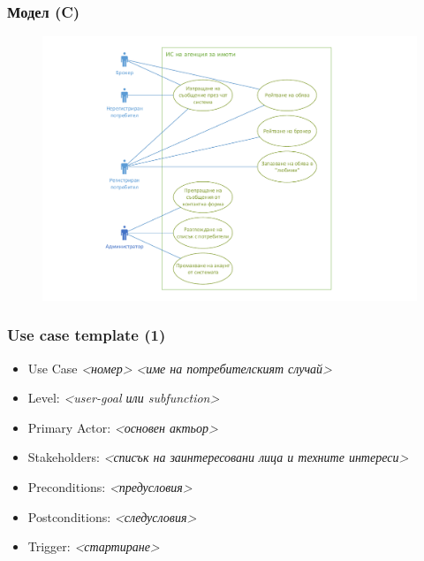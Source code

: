 \documentclass[12pt]{beamer}
\begin{document}
\begin{frame}[fragile]
\frametitle{Модел (C)}
        \begin{figure}[h]
        \centering
        \includegraphics[scale=0.5]{uc1-c}
        \end{figure}
\end{frame}

\begin{frame}[fragile]
\frametitle{Use case template (1)}
\begin{itemize}
	\item Use Case \textit{<номер>} \textit{<име на потребителският случай>}
	\item Level: \textit{<user-goal или subfunction>}
	\item Primary Actor: \textit{<основен актьор>}
	\item Stakeholders: \textit{<списък на заинтересовани лица и техните интереси>}
	\item Preconditions: \textit{<предусловия>}
	\item Postconditions: \textit{<следусловия>}	
	\item Trigger: \textit{<стартиране>}
\end{itemize}
\end{frame}
\end{document}
